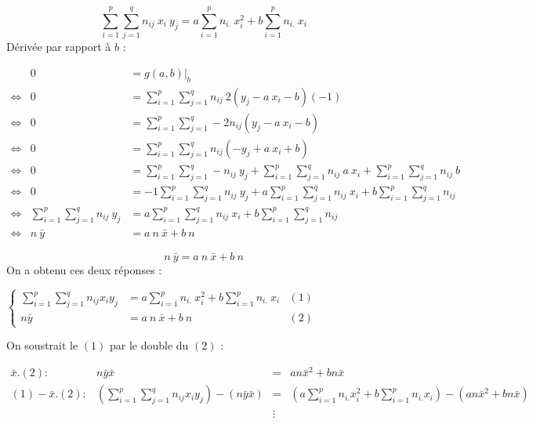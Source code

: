 $$\boxed{\sum_{i=1}^{p} \sum_{j=1}^{q} n_{ij}\ x_i\ y_j = a \sum_{i=1}^{p} n_{i.}\ x_i^2 + b \sum_{i=1}^{p} n_{i.}\ x_i}$$
Dérivée par rapport à $b$ :
\begin{center}
	$\begin{array}{CCL}
		                & 0 &= \left.g(a,b)\right|_b\\
		\Leftrightarrow & 0 &= \sum_{i=1}^{p} \sum_{j=1}^{q} n_{ij}\ 2(y_j - a\ x_i-b)(-1)\\
		\Leftrightarrow & 0 &= \sum_{i=1}^{p} \sum_{j=1}^{q} -2n_{ij}(y_j - a\ x_i - b)\\
		\Leftrightarrow & 0 &= \sum_{i=1}^{p} \sum_{j=1}^{q} n_{ij}(-y_j + a\ x_i + b)\\
		\Leftrightarrow & 0 &= \sum_{i=1}^{p} \sum_{j=1}^{q} -n_{ij}\ y_j + \sum_{i=1}^{p} \sum_{j=1}^{q} n_{ij}\ a\ x_i + \sum_{i=1}^{p} \sum_{j=1}^{q} n_{ij}\ b\\
		\Leftrightarrow & 0 &= -1 \sum_{i=1}^{p} \sum_{j=1}^{q} n_{ij}\ y_j + a \sum_{i=1}^{p} \sum_{j=1}^{q} n_{ij}\ x_i + b \sum_{i=1}^{p} \sum_{j=1}^{q} n_{ij}\\
		\Leftrightarrow & \sum_{i=1}^{p} \sum_{j=1}^{q} n_{ij}\ y_j &= a \sum_{i=1}^{p} \sum_{j=1}^{q} n_{ij}\ x_i + b \sum_{i=1}^{p} \sum_{j=1}^{q} n_{ij}\\
		\Leftrightarrow & n\ \bar{y} &= a\ n\ \bar{x} + b\ n
	\end{array}$
\end{center}
$$\boxed{n\ \bar{y} = a\ n\ \bar{x} + b\ n}$$
On a obtenu ces deux réponses :
\begin{center}
	$\left\{
	\begin{array}{RLC}
		\sum_{i=1}^{p} \sum_{j=1}^{q}n_{ij}x_iy_j &= a \sum_{i=1}^{p} n_{i.}\ x_i^2 + b \sum_{i=1}^{p} n_{i.}\ x_i &(1)\\
		n\bar{y} &= a\ n\ \bar{x} + b\ n&(2)
	\end{array}
	\right.$
\end{center}
On soustrait le $(1)$ par le double du $(2)$ :
\begin{center}
	$\begin{array}{RRCL}
		\bar{x}.(2) :& n\bar{y}\bar{x} &=& an\bar{x}^2 + bn\bar{x}\\
		(1) - \bar{x}.(2) :& \left(\sum_{i=1}^{p} \sum_{j=1}^{q} n_{ij}x_iy_j \right) - ( n\bar{y}\bar{x} ) &=& \left( a \sum_{i=1}^{p} n_{i.}x_i^2 + b\sum_{i=1}^{p} n_{i.}x_i \right) - \left( an\bar{x}^2 + bn\bar{x} \right)\\
        &&\vdots&
	\end{array}$
\end{center}
